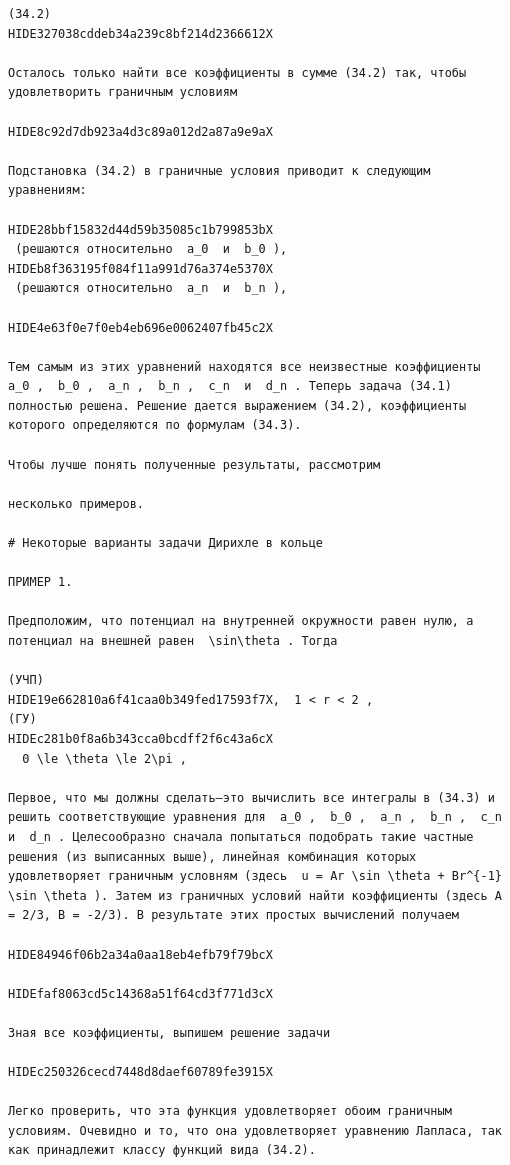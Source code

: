 \documentclass[
  ukrainian,
]{article}
\begin{document}
\begin{verbatim}
(34.2) 
HIDE327038cddeb34a239c8bf214d2366612X

Осталось только найти все коэффициенты в сумме (34.2) так, чтобы удовлетворить граничным условиям

HIDE8c92d7db923a4d3c89a012d2a87a9e9aX

Подстановка (34.2) в граничные условия приводит к следующим уравнениям:

HIDE28bbf15832d44d59b35085c1b799853bX
 (решаются относительно  a_0  и  b_0 ), 
HIDEb8f363195f084f11a991d76a374e5370X
 (решаются относительно  a_n  и  b_n ),

HIDE4e63f0e7f0eb4eb696e0062407fb45c2X

Тем самым из этих уравнений находятся все неизвестные коэффициенты  a_0 ,  b_0 ,  a_n ,  b_n ,  c_n  и  d_n . Теперь задача (34.1) полностью решена. Решение дается выражением (34.2), коэффициенты которого определяются по формулам (34.3).

Чтобы лучше понять полученные результаты, рассмотрим

несколько примеров.

# Некоторые варианты задачи Дирихле в кольце

ПРИМЕР 1.

Предположим, что потенциал на внутренней окружности равен нулю, а потенциал на внешней равен  \sin\theta . Тогда

(УЧП) 
HIDE19e662810a6f41caa0b349fed17593f7X,  1 < r < 2 ,  
(ГУ) 
HIDEc281b0f8a6b343cca0bcdff2f6c43a6cX
  0 \le \theta \le 2\pi ,

Первое, что мы должны сделать—это вычислить все интегралы в (34.3) и решить соответствующие уравнения для  a_0 ,  b_0 ,  a_n ,  b_n ,  c_n  и  d_n . Целесообразно сначала попытаться подобрать такие частные решения (из выписанных выше), линейная комбинация которых удовлетворяет граничным условням (здесь  u = Ar \sin \theta + Br^{-1} \sin \theta ). Затем из граничных условий найти коэффициенты (здесь A = 2/3, B = -2/3). В результате этих простых вычислений получаем

HIDE84946f06b2a34a0aa18eb4efb79f79bcX

HIDEfaf8063cd5c14368a51f64cd3f771d3cX

Зная все коэффициенты, выпишем решение задачи

HIDEc250326cecd7448d8daef60789fe3915X

Легко проверить, что эта функция удовлетворяет обоим граничным условиям. Очевидно и то, что она удовлетворяет уравнению Лапласа, так как принадлежит классу функций вида (34.2).


\end{verbatim}
\end{document}
